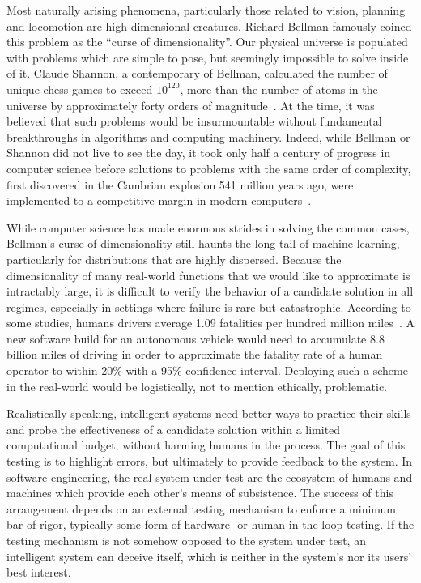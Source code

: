 \documentclass[12pt,initial,twoside,maitrise]{dms}
\numberwithin{equation}{section}
\numberwithin{table}{chapter}
\numberwithin{figure}{chapter}
\begin{document}
Most naturally arising phenomena, particularly those related to vision, planning and locomotion are high dimensional creatures. Richard Bellman famously coined this problem as the ``curse of dimensionality''. Our physical universe is populated with problems which are simple to pose, but seemingly impossible to solve inside of it. Claude Shannon, a contemporary of Bellman, calculated the number of unique chess games to exceed $10^{120}$, more than the number of atoms in the universe by approximately forty orders of magnitude~\citep{shannon1950chess}. At the time, it was believed that such problems would be insurmountable without fundamental breakthroughs in algorithms and computing machinery. Indeed, while Bellman or Shannon did not live to see the day, it took only half a century of progress in computer science before solutions to problems with the same order of complexity, first discovered in the Cambrian explosion 541 million years ago, were implemented to a competitive margin in modern computers~\citep{pratt2015cambrian}.

While computer science has made enormous strides in solving the common cases, Bellman's curse of dimensionality still haunts the long tail of machine learning, particularly for distributions that are highly dispersed. Because the dimensionality of many real-world functions that we would like to approximate is intractably large, it is difficult to verify the behavior of a candidate solution in all regimes, especially in settings where failure is rare but catastrophic. According to some studies, humans drivers average 1.09 fatalities per hundred million miles~\citep{kalra2016driving}. A new software build for an autonomous vehicle would need to accumulate 8.8 billion miles of driving in order to approximate the fatality rate of a human operator to within 20\% with a 95\% confidence interval. Deploying such a scheme in the real-world would be logistically, not to mention ethically, problematic.

Realistically speaking, intelligent systems need better ways to practice their skills and probe the effectiveness of a candidate solution within a limited computational budget, without harming humans in the process. The goal of this testing is to highlight errors, but ultimately to provide feedback to the system. In software engineering, the real system under test are the ecosystem of humans and machines which provide each other's means of subsistence. The success of this arrangement depends on an external testing mechanism to enforce a minimum bar of rigor, typically some form of hardware- or human-in-the-loop testing. If the testing mechanism is not somehow opposed to the system under test, an intelligent system can deceive itself, which is neither in the system's nor its users' best interest.
\end{document}
